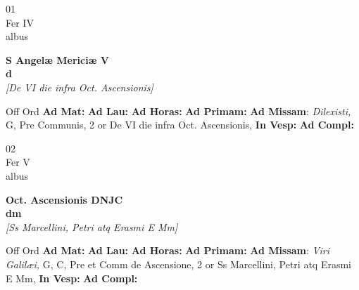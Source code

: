 \documentclass[10pt, openany]{book}
\begin{document}
    \begin{center}
        \begin{minipage}{3.5in}
            \vspace{2em}
            \begin{minipage}{0.5in}
                {\Huge 01} \\
                {\normalsize Fer IV} \\
                {\normalsize albus}
            \end{minipage}
            \begin{minipage}{3.0in}
                \textbf{ \large S Angelæ Mericiæ V \\
                \textnormal{\normalsize d}} \\ \textit{[De VI die infra Oct. Ascensionis]} \\ 
            \end{minipage}
            \begin{justify}Off Ord
                \textbf{Ad Mat: }
                \textbf{Ad Lau: }
                \textbf{Ad Horas: }
                \textbf{Ad Primam: }\textbf{Ad Missam}: \textit{Dilexisti,} G, Pre Communis, 2 or De VI die infra Oct. Ascensionis,  
                \textbf{In Vesp: }
                \textbf{Ad Compl: }
            \end{justify}
        \end{minipage}
    \end{center}

    \begin{center}
        \begin{minipage}{3.5in}
            \vspace{2em}
            \begin{minipage}{0.5in}
                {\Huge 02} \\
                {\normalsize Fer V} \\
                {\normalsize albus}
            \end{minipage}
            \begin{minipage}{3.0in}
                \textbf{ \large Oct. Ascensionis DNJC \\
                \textnormal{\normalsize dm}} \\ \textit{[Ss Marcellini, Petri atq Erasmi E Mm]} \\ 
            \end{minipage}
            \begin{justify}Off Ord
                \textbf{Ad Mat: }
                \textbf{Ad Lau: }
                \textbf{Ad Horas: }
                \textbf{Ad Primam: }\textbf{Ad Missam}: \textit{Viri Galilæi,} G, C, Pre et Comm de Ascensione, 2 or Ss Marcellini, Petri atq Erasmi E Mm,  
                \textbf{In Vesp: }
                \textbf{Ad Compl: }
            \end{justify}
        \end{minipage}
    \end{center}
\end{document}
